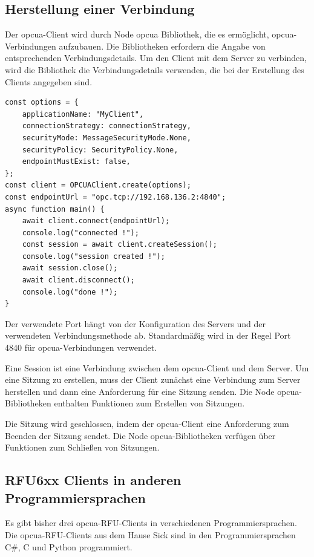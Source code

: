 \subsection{Herstellung einer Verbindung}
Der \ac{opcua}-Client wird durch Node \ac{opcua} Bibliothek, die es ermöglicht, \ac{opcua}-Verbindungen aufzubauen. Die Bibliotheken erfordern die Angabe von entsprechenden Verbindungsdetails. Um den Client mit dem Server zu verbinden, wird die Bibliothek die Verbindungsdetails verwenden, die bei der Erstellung des Clients angegeben sind.
\begin{lstlisting}[style=JavaScript, caption={Node OPCUAClient Create}]
const options = {
    applicationName: "MyClient",
    connectionStrategy: connectionStrategy,
    securityMode: MessageSecurityMode.None,
    securityPolicy: SecurityPolicy.None,
    endpointMustExist: false,
};
const client = OPCUAClient.create(options);
const endpointUrl = "opc.tcp://192.168.136.2:4840";
async function main() {
    await client.connect(endpointUrl);
    console.log("connected !");
    const session = await client.createSession();
    console.log("session created !");
    await session.close();
    await client.disconnect();
    console.log("done !");
}
\end{lstlisting}

Der verwendete Port hängt von der Konfiguration des Servers und der verwendeten Verbindungsmethode ab. Standardmäßig wird in der Regel Port 4840 für \ac{opcua}-Verbindungen verwendet.

Eine Session ist eine Verbindung zwischen dem \ac{opcua}-Client und dem Server. Um eine Sitzung zu erstellen, muss der Client zunächst eine Verbindung zum Server herstellen und dann eine Anforderung für eine Sitzung senden. Die Node \ac{opcua}-Bibliotheken enthalten Funktionen zum Erstellen von Sitzungen.

Die Sitzung wird geschlossen, indem der \ac{opcua}-Client eine Anforderung zum Beenden der Sitzung sendet. Die Node \ac{opcua}-Bibliotheken verfügen über Funktionen zum Schließen von Sitzungen.

\subsection{RFU6xx Clients in anderen Programmiersprachen}

Es gibt bisher drei \ac{opcua}-RFU-Clients in verschiedenen Programmiersprachen. Die \ac{opcua}-RFU-Clients aus dem Hause Sick sind in den Programmiersprachen C\#, C und Python programmiert.\\


